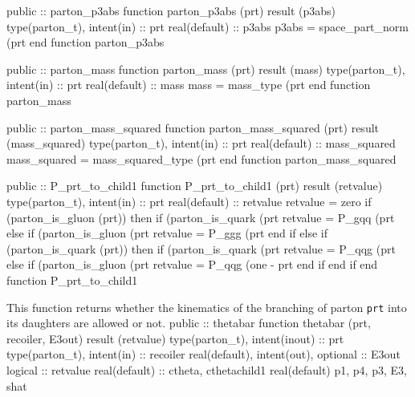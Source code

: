 \eatline
\nwendcode{}\nwdocspar
\nwenddocs{}\plusendmoddef
  public :: parton_p3abs
\nwendcode{}\plusendmoddef
  function parton_p3abs (prt) result (p3abs)
    type(parton_t), intent(in) :: prt
    real(default) :: p3abs
    p3abs = space_part_norm (prt%
  end function parton_p3abs

\eatline
\nwendcode{}\nwdocspar
\nwenddocs{}\plusendmoddef
  public :: parton_mass
\nwendcode{}\plusendmoddef
  function parton_mass (prt) result (mass)
    type(parton_t), intent(in) :: prt
    real(default) :: mass
    mass = mass_type (prt%
  end function parton_mass

\eatline
\nwendcode{}\nwdocspar
\nwenddocs{}\plusendmoddef
  public :: parton_mass_squared
\nwendcode{}\plusendmoddef
  function parton_mass_squared (prt) result (mass_squared)
    type(parton_t), intent(in) :: prt
    real(default) :: mass_squared
    mass_squared = mass_squared_type (prt%
  end function parton_mass_squared

\eatline
\nwendcode{}\nwdocspar
\nwenddocs{}\plusendmoddef
  public :: P_prt_to_child1
\nwendcode{}\plusendmoddef
  function P_prt_to_child1 (prt) result (retvalue)
    type(parton_t), intent(in) :: prt
    real(default) :: retvalue
    retvalue = zero
    if (parton_is_gluon (prt)) then
       if (parton_is_quark (prt%
          retvalue = P_gqq (prt%
       else if (parton_is_gluon (prt%
          retvalue = P_ggg (prt%
       end if
    else if (parton_is_quark (prt)) then
       if (parton_is_quark (prt%
          retvalue = P_qqg (prt%
       else if (parton_is_gluon (prt%
          retvalue = P_qqg (one - prt%
       end if
    end if
  end function P_prt_to_child1

\eatline
\nwendcode{}This function returns whether the kinematics of the branching of
parton {\tt{}prt} into its daughters are allowed or not.
\nwenddocs{}\plusendmoddef
  public :: thetabar
\nwendcode{}\plusendmoddef
  function thetabar (prt, recoiler, E3out) result (retvalue)
    type(parton_t), intent(inout) :: prt
    type(parton_t), intent(in) :: recoiler
    real(default), intent(out), optional :: E3out
    logical :: retvalue
    real(default) :: ctheta, cthetachild1
    real(default) p1, p4, p3, E3, shat

